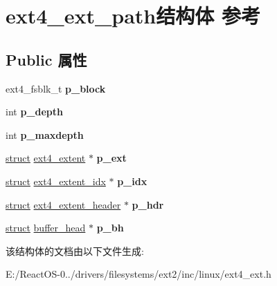 \hypertarget{structext4__ext__path}{}\section{ext4\+\_\+ext\+\_\+path结构体 参考}
\label{structext4__ext__path}
\subsection*{Public 属性}
\begin{DoxyCompactItemize}
\item 
\mbox{\label{structext4__ext__path_af1e1dfaa241242a5948a7fdb12539160}} 
ext4\+\_\+fsblk\+\_\+t {\bfseries p\+\_\+block}
\item 
\mbox{\label{structext4__ext__path_a0f4fcfc6ce52958cf42cb9a6c83c7614}} 
int {\bfseries p\+\_\+depth}
\item 
\mbox{\label{structext4__ext__path_a340e02478e2432e1572d23b5a87df84d}} 
int {\bfseries p\+\_\+maxdepth}
\item 
\mbox{\label{structext4__ext__path_ad94403f73ca2e951495f7f40f2758fc9}} 
\hyperlink{interfacestruct}{struct} \hyperlink{structext4__extent}{ext4\+\_\+extent} $\ast$ {\bfseries p\+\_\+ext}
\item 
\mbox{\label{structext4__ext__path_ad2391a52f4a2787de59117fa4527440a}} 
\hyperlink{interfacestruct}{struct} \hyperlink{structext4__extent__idx}{ext4\+\_\+extent\+\_\+idx} $\ast$ {\bfseries p\+\_\+idx}
\item 
\mbox{\label{structext4__ext__path_a4385b2895bfa7603adb94d8fb1d59ba3}} 
\hyperlink{interfacestruct}{struct} \hyperlink{structext4__extent__header}{ext4\+\_\+extent\+\_\+header} $\ast$ {\bfseries p\+\_\+hdr}
\item 
\mbox{\label{structext4__ext__path_aa55024f5139b7ace18c00f1fb00aa3ed}} 
\hyperlink{interfacestruct}{struct} \hyperlink{structbuffer__head}{buffer\+\_\+head} $\ast$ {\bfseries p\+\_\+bh}
\end{DoxyCompactItemize}


该结构体的文档由以下文件生成\+:\begin{DoxyCompactItemize}
\item 
E\+:/\+React\+O\+S-\/0../drivers/filesystems/ext2/inc/linux/ext4\+\_\+ext.\+h\end{DoxyCompactItemize}
